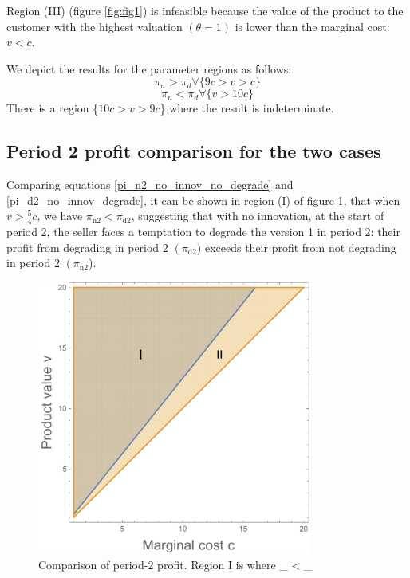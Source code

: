 \documentclass[isre,blindrev]{informs3} %
\begin{document}
Region (III) (figure \ref{fig:fig1}) is infeasible because the value of the product to the customer with the highest valuation \((\theta =1)\) is lower
than the marginal cost: \(v<c\).

We depict the results for the parameter regions as follows:
\begin{equation}
\pi _n>\pi _d \forall \{9 c> v>c\}
\end{equation}
\begin{equation}
\pi _n<\pi _d \forall \{v>10c\}
\end{equation}
There is a region {\{\(10 c > v> 9 c\)\}} where the result is indeterminate.

\subsection{Period 2 profit comparison for the two cases}
\label{no-innovate-compare-period-2}

Comparing equations \ref{pi_n2_no_innov_no_degrade} and \ref{pi_d2_no_innov_degrade}, it can be shown in region (I) of figure \ref{fig:fig2}, that when \(v>\frac{5}{4}c\), we have \(\pi _{\text{n2}}<\pi _{\text{d2}}\),
suggesting that with no innovation, at the start of period 2, the seller faces a temptation to degrade the version 1 in period 2: their profit from
degrading in period 2 \(\left(\pi _{\text{d2}}\right.\)) exceeds their profit from not degrading in period 2 \(\left(\pi _{\text{n2}}\right.\)).

\begin{figure}[htp]
    \centering
    \includegraphics[width=9cm]{2020_05_19-overleaf-mirror_gr2.pdf}
    \caption{Comparison of period-2 profit. Region I is where \pi _{} < \pi _{} }
    \label{fig:fig2}
\end{figure}
\end{document}
